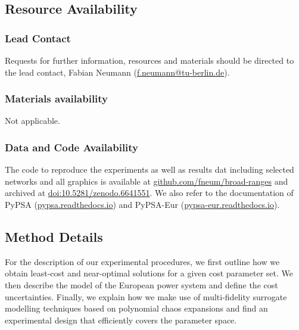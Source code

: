 \subsection*{Resource Availability}

\subsubsection*{Lead Contact}

Requests for further information, resources and materials should be directed to
the lead contact, Fabian Neumann
(\href{mailto:f.neumann@tu-berlin.de}{f.neumann@tu-berlin.de}).

\subsubsection*{Materials availability}

Not applicable.

\subsubsection*{Data and Code Availability}

The code to reproduce the experiments as well as results dat including selected
networks and all graphics is available at
\href{https://github.com/fneum/broad-ranges}{github.com/fneum/broad-ranges} and
archived at
\href{https://doi.org/10.5281/zenodo.6641551}{doi:10.5281/zenodo.6641551}. We
also refer to the documentation of PyPSA
(\href{https://pypsa.readthedocs.io}{pypsa.readthedocs.io}) and PyPSA-Eur
(\href{https://pypsa-eur.readthedocs.io}{pypsa-eur.readthedocs.io}).

\subsection*{Method Details}

For the description of our experimental procedures, we first outline how we
obtain least-cost and near-optimal solutions for a given cost parameter set. We
then describe the model of the European power system and define the cost
uncertainties. Finally, we explain how we make use of multi-fidelity surrogate
modelling techniques based on polynomial chaos expansions and find an
experimental design that efficiently covers the parameter space.



